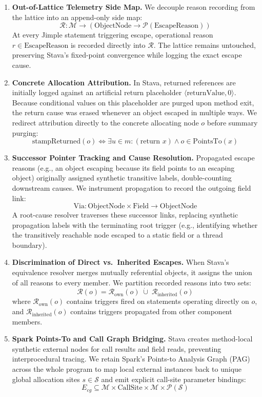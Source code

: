 \documentclass[12pt,a4paper]{article}
\newcommand{\PointsTo}{\text{PointsTo}}
\begin{document}
\begin{enumerate}[leftmargin=*]
  \item \textbf{Out-of-Lattice Telemetry Side Map.} We decouple reason recording from the lattice into an append-only side map:
  \[
  \mathcal{R} : \mathcal{M} \to (\text{ObjectNode} \to \mathcal{P}(\text{EscapeReason}))
  \]
  At every Jimple statement triggering escape, operational reason $r \in \text{EscapeReason}$ is recorded directly into $\mathcal{R}$. The lattice remains untouched, preserving Stava's fixed-point convergence while logging the exact escape cause.

  \item \textbf{Concrete Allocation Attribution.} In Stava, returned references are initially logged against an artificial return placeholder $\langle \text{returnValue}, 0 \rangle$. Because conditional values on this placeholder are purged upon method exit, the return cause was erased whenever an object escaped in multiple ways. We redirect attribution directly to the concrete allocating node $o$ before summary purging:
  \[
  \text{stampReturned}(o) \iff \exists u \in m: (\text{return } x) \land o \in \PointsTo(x)
  \]

  \item \textbf{Successor Pointer Tracking and Cause Resolution.} Propagated escape reasons (e.g., an object escaping because its field points to an escaping object) originally assigned synthetic transitive labels, double-counting downstream causes. We instrument propagation to record the outgoing field link:
  \[
  \text{Via} : \text{ObjectNode} \times \text{Field} \to \text{ObjectNode}
  \]
  A root-cause resolver traverses these successor links, replacing synthetic propagation labels with the terminating root trigger (e.g., identifying whether the transitively reachable node escaped to a static field or a thread boundary).

  \item \textbf{Discrimination of Direct vs.\ Inherited Escapes.} When Stava's equivalence resolver merges mutually referential objects, it assigns the union of all reasons to every member. We partition recorded reasons into two sets:
  \[
  \mathcal{R}(o) = \mathcal{R}_{\text{own}}(o) \;\dot{\cup}\; \mathcal{R}_{\text{inherited}}(o)
  \]
  where $\mathcal{R}_{\text{own}}(o)$ contains triggers fired on statements operating directly on $o$, and $\mathcal{R}_{\text{inherited}}(o)$ contains triggers propagated from other component members.

  \item \textbf{Spark Points-To and Call Graph Bridging.} Stava creates method-local synthetic external nodes for call results and field reads, preventing interprocedural tracing. We retain Spark's Points-to Analysis Graph (PAG) across the whole program to map local external instances back to unique global allocation sites $s \in \mathcal{S}$ and emit explicit call-site parameter bindings:
  \[
  E_{cg} \subseteq \mathcal{M} \times \text{CallSite} \times \mathcal{M} \times \mathcal{P}(\mathcal{S})
  \]
\end{enumerate}
\end{document}
